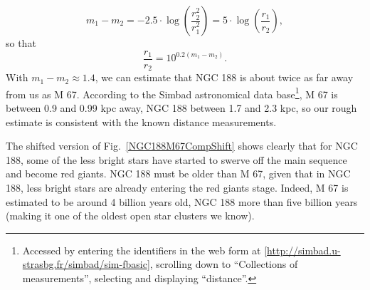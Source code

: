 \documentclass[twocolumn,apj]{openjournal}
\newcommand{\be}{\begin{equation}}
\newcommand{\ee}{\end{equation}}
\begin{document}
\be
m_1 - m_2 = -2.5\cdot\log\left(\frac{r_2^2}{r_1^2}\right) = 5\cdot\log\left(\frac{r_1}{r_2}\right),
\ee
so that
\be
\frac{r_1}{r_2} = 10^{0.2(m_1-m_2)}.
\ee
With $m_1-m_2\approx 1.4$, we can estimate that NGC 188 is about twice as far away from us as M 67. According to the Simbad astronomical data base\footnote{Accessed by entering the identifiers in the web form at [\href{http://simbad.u-strasbg.fr/simbad/sim-fbasic}{http://simbad.u-strasbg.fr/simbad/sim-fbasic}], scrolling down to ``Collections of measurements'', selecting and displaying ``distance''.}, M 67 is between 0.9 and 0.99 kpc away, NGC 188 between 1.7 and 2.3 kpc, so our rough estimate is consistent with the known distance measurements. 

The shifted version of Fig.~\ref{NGC188M67CompShift} shows clearly that for NGC 188, some of the less bright stars have started to swerve off the main sequence and become red giants.  NGC 188 must be older than M 67, given that in NGC 188, less bright stars are already entering the red giants stage. Indeed, M 67 is estimated to be around 4 billion years old, NGC 188 more than five billion years (making it one of the oldest open star clusters we know).
\end{document}
